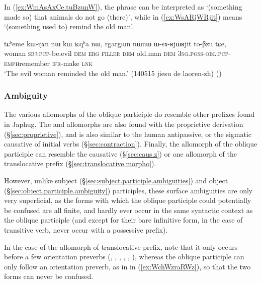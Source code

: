 In (\ref{ex:WmAsAxCe.tuBzunW}), the phrase  can be interpreted as `(something made so) that animals do not go (there)', while in (\ref{ex:WsARjWRjit})  means `(something used to) remind the old man'. 

\begin{exe}
\ex \label{ex:WsARjWRjit}
\gll tɕʰeme kɯ-ŋɤn nɯ kɯ iɕqʰa nɯ, rgargɯn nɯnɯ ɯ-sɤ-ʁjɯ\redp{}ʁjit to-βzu tɕe, \\
woman \textsc{sbj}:\textsc{pcp}-be.evil \textsc{dem} \textsc{erg} \textsc{filler} \textsc{dem} old.man \textsc{dem} \textsc{3sg}.\textsc{poss}-\textsc{obl}:\textsc{pcp}-\textsc{emph}\redp{}remember \textsc{ifr}-make \textsc{lnk} \\
\glt `The evil woman reminded the old man.' (140515 jiesu de laoren-zh)
()
\end{exe}


\subsubsection{Ambiguity} \label{sec:oblique.participle.ambiguity}
The various allomorphs of the oblique participle do resemble other prefixes found in Japhug. The  and  allomorphs are also found with the proprietive derivation (§\ref{sec:proprietive}), and  is also similar to the human antipassive, or the sigmatic causative of  initial verbs (§\ref{sec:contraction}). Finally, the  allomorph of the oblique participle can resemble the causative (§\ref{sec:caus.z}) or one allomorph of the translocative prefix (§\ref{sec:translocative.morpho}).

However, unlike subject (§\ref{sec:subject.participle.ambiguities}) and object (§\ref{sec:object.participle.ambiguity}) participles, these surface ambiguities are only very superficial, as the forms with which the oblique participle could potentially be confused are all finite, and hardly ever occur in the same syntactic context as the oblique participle (and except for their bare infinitive form, in the case of transitive verb, never occur with a possessive prefix). 

In the case of the  allomorph of translocative prefix, note that it only occurs before a few orientation preverbs (, , , , , ), whereas the oblique participle  can only follow an orientation preverb, as in  in (\ref{ex:WchWzraRWz}), so that the two forms can never be confused.

